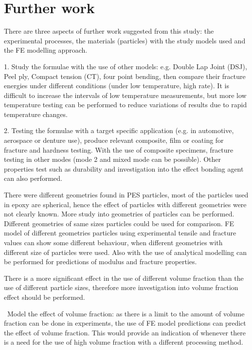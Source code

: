 \documentclass[numbers=noendperiod,chapterprefix=on]{icldt} %
\begin{document}
{\chapter{Further work} \label{Further_work}
There are three aspects of further work suggested from this study: the experimental processes, the materials (particles) with the study models used and the FE modelling approach.

1. Study the formulae with the use of other models: e.g. Double Lap Joint (DSJ), Peel ply, Compact tension (CT), four point bending, then compare their fracture energies under different conditions (under low temperature, high rate). It is difficult to increase the intervals of low temperature measurements, but more low temperature testing can be performed to reduce variations of results due to rapid temperature changes. 

2. Testing the formulae with a target specific application (e.g. in automotive, aerospace or denture use), produce relevant composite, film or coating for fracture and hardness testing. With the use of composite specimens, fracture testing in other modes (mode 2 and mixed mode can be possible). Other properties test such as durability and investigation into the effect bonding agent can also performed.

There were different geometries found in PES particles, most of the particles used in epoxy are spherical, hence the effect of particles with different geometries were not clearly known. More study into geometries of particles can be performed. Different geometries of same sizes particles could be used for comparison. FE model of different geometries particles using experimental tensile and fracture values can show some different behaviour, when different geometries with different size of particles were used. Also with the use of analytical modelling can be performed for predictions of modulus and fracture properties.

There is a more significant effect in the use of different volume fraction than the use of different particle sizes, therefore more investigation into volume fraction effect should be performed. 

~Model the effect of volume fraction: as there is a limit to the amount of volume fraction can be done in experiments, the use of FE model predictions can predict the effect of volume fraction. This would provide an indication of whenever there is a need for the use of high volume fraction with a different processing method.

}
\end{document}
